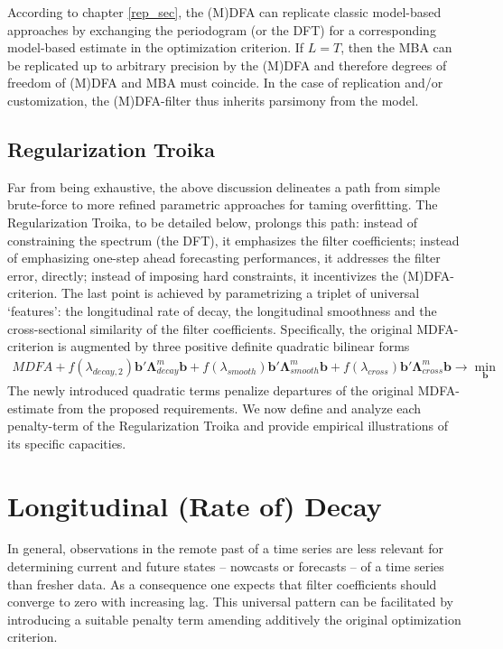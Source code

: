 \documentclass[a4paper]{book}
\begin{document}
According to chapter \ref{rep_sec}, the (M)DFA can replicate classic model-based approaches by exchanging the periodogram (or the DFT) for a corresponding model-based estimate in the optimization criterion. If $L=T$, then the MBA can be replicated up to arbitrary precision by the (M)DFA and therefore degrees of freedom of (M)DFA and MBA must coincide. In the case of replication and/or customization, the (M)DFA-filter thus inherits parsimony from the model.   




\subsection{Regularization Troika}

Far from being exhaustive, the above discussion delineates a path from simple brute-force to more refined parametric approaches for taming overfitting. The Regularization Troika, to be detailed below, prolongs this path: instead of constraining the spectrum (the DFT), it emphasizes the filter coefficients; instead of emphasizing one-step ahead forecasting performances, it addresses the filter error, directly; instead of imposing hard constraints, it incentivizes the (M)DFA-criterion. The last point is achieved by parametrizing a triplet of universal `features': the longitudinal rate of decay, the longitudinal smoothness and the cross-sectional similarity of the filter coefficients. Specifically, the original MDFA-criterion is augmented by three positive definite quadratic bilinear forms   
\begin{eqnarray*}
MDFA+f(\lambda_{decay,2})\mathbf{b}'\boldsymbol{\Lambda}_{decay}^m\mathbf{b}+f(\lambda_{smooth})\mathbf{b}'\boldsymbol{\Lambda}_{smooth}^m\mathbf{b}+f(\lambda_{cross})\mathbf{b}'\boldsymbol{\Lambda}_{cross}^m\mathbf{b}\to \min_{\mathbf{b}}
\end{eqnarray*}
The newly introduced quadratic terms penalize departures of the original MDFA-estimate from the proposed requirements. We now define and analyze each penalty-term of the Regularization Troika and provide empirical illustrations of its specific capacities.




\section{Longitudinal (Rate of) Decay}\label{decay_reg}



In general, observations in the remote past of a time series are less relevant for determining current and future states -- nowcasts or forecasts -- of a time series than fresher data. As a consequence one expects that filter coefficients should converge to zero with increasing lag. This universal pattern can be facilitated by introducing a suitable penalty term amending additively the original optimization criterion. 
\end{document}
